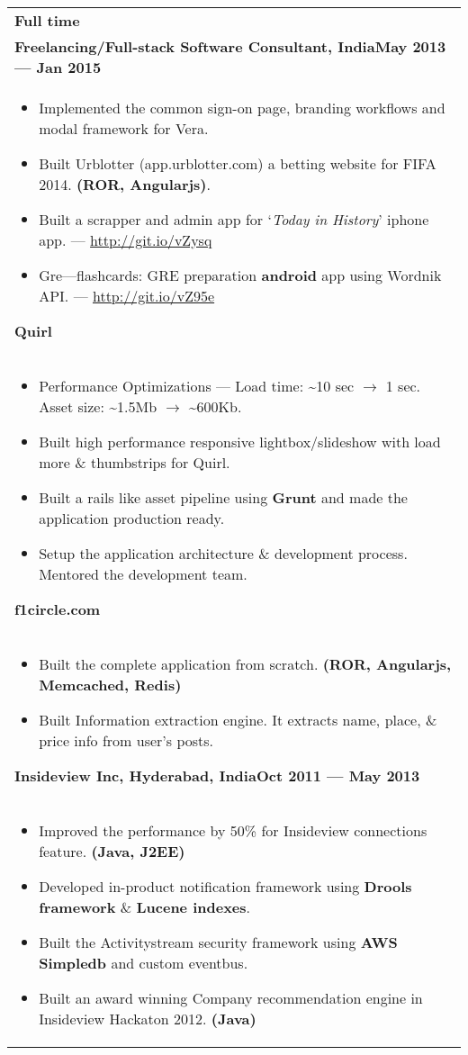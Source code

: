\documentclass{article}
\begin{document}
\begin{tabular}{p{\dimexpr\linewidth-2\tabcolsep}}
    \bigskip
    \bfseries \large{Full time}\\
    \smallskip
    {\bfseries Freelancing/Full-stack Software Consultant, India\hfill May 2013 --- Jan 2015} \\
    \begin{itemize}
        \item Implemented the common sign-on page, branding workflows and modal framework for Vera.
        \item Built Urblotter (app.urblotter.com) a betting website for FIFA 2014. \textbf{(ROR, Angularjs)}.
        \item Built a scrapper and admin app for `\textit{Today in History}' iphone app. --- \url{http://git.io/vZysq}
        \item Gre---flashcards: GRE preparation \textbf{android} app using Wordnik API\@. --- \url{http://git.io/vZ95e}
    \end{itemize}
    \bigskip
    \bfseries \enskip{} Quirl \\
    \begin{itemize}
        \item Performance Optimizations --- Load time: \textasciitilde10 sec \( \rightarrow \) 1 sec. Asset size: \textasciitilde1.5Mb \( \rightarrow \) \textasciitilde600Kb.
        \item Built high performance responsive lightbox/slideshow with load more \& thumbstrips for Quirl.
        \item Built a rails like asset pipeline using \textbf{Grunt} and made the application production ready.
        \item Setup the application architecture \& development process. Mentored the development team.
    \end{itemize}
    \bigskip
    \bfseries \enskip{} f1circle.com \\
    \begin{itemize}
        \item Built the complete application from scratch. \textbf{(ROR, Angularjs, Memcached, Redis)}
        \item Built Information extraction engine. It extracts name, place, \& price info from user's posts.
    \end{itemize}

    \bigskip
    {\bfseries Insideview Inc, Hyderabad, India\hfill Oct 2011 --- May 2013} \\
    \begin{itemize}
      \item Improved the performance by 50\% for Insideview connections feature. \textbf{(Java, J2EE)}
      \item Developed in-product notification framework using \textbf{Drools framework} \& \textbf{Lucene indexes}.
      \item Built the Activitystream security framework using \textbf{AWS Simpledb} and custom eventbus.
    \item Built an award winning Company recommendation engine in Insideview Hackaton 2012. \textbf{(Java)}
    \end{itemize}


\end{tabular}
\end{document}
